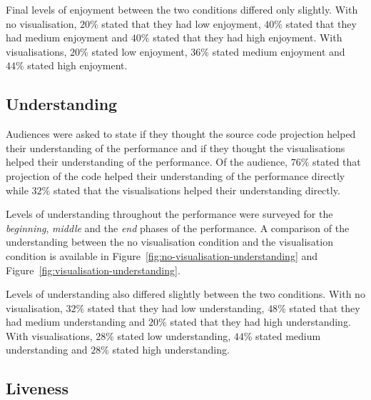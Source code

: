 Final levels of enjoyment between the two conditions differed only slightly. With no visualisation, $20\%$ stated that they had low enjoyment, $40\%$ stated that they had medium enjoyment and $40\%$ stated that they had high enjoyment. With visualisations, $20\%$ stated low enjoyment, $36\%$ stated medium enjoyment and $44\%$ stated high enjoyment.

\subsection{Understanding}



Audiences were asked to state if they thought the source code projection helped their understanding of the performance and if they thought the visualisations helped their understanding of the performance. Of the audience, $76\%$ stated that projection of the code helped their understanding of the performance directly while $32\%$ stated that the visualisations helped their understanding directly.

Levels of understanding throughout the performance were surveyed for the \emph{beginning}, \emph{middle} and the \emph{end} phases of the performance. A comparison of the understanding between the no visualisation condition and the visualisation condition is available in Figure~\ref{fig:no-visualisation-understanding} and Figure~\ref{fig:visualisation-understanding}.

Levels of understanding also differed slightly between the two conditions. With no visualisation, $32\%$ stated that they had low understanding, $48\%$ stated that they had medium understanding and $20\%$ stated that they had high understanding. With visualisations, $28\%$ stated low understanding, $44\%$ stated medium understanding and $28\%$ stated high understanding.


\subsection{Liveness}

